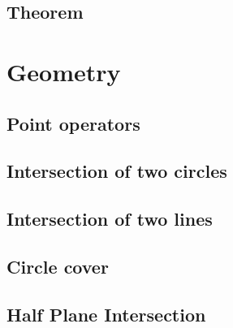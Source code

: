 \documentclass[a4paper,10pt,twocolumn,oneside]{article}
\begin{document}
%

\subsection{Theorem}


%


\section{Geometry}
\subsection{Point operators}


\subsection{Intersection of two circles}
%


\subsection{Intersection of two lines}


\subsection{Circle cover}


\subsection{Half Plane Intersection}

\end{document}
